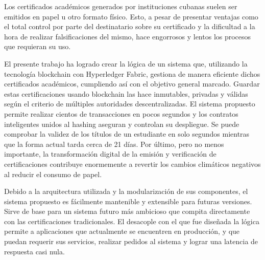 \begin{conclusions}
Los certificados académicos generados por instituciones cubanas suelen ser emitidos en papel u otro formato físico. Esto, a pesar de presentar ventajas como el total control por parte del destinatario sobre su certificado y la dificultad a la hora de realizar falsificaciones del mismo, hace engorrosos y lentos los procesos que requieran su uso.
    
El presente trabajo ha logrado crear la lógica de un sistema que, utilizando la tecnología blockchain con Hyperledger Fabric, gestiona de manera eficiente dichos certificados académicos, cumpliendo así con el objetivo general marcado. Guardar estas certificaciones usando blockchain las hace inmutables, privadas y válidas según el criterio de múltiples autoridades descentralizadas. El sistema propuesto permite realizar cientos de transacciones en pocos segundos y los contratos inteligentes unidos al hashing aseguran y controlan su despliegue. Se puede comprobar la validez de los títulos de un estudiante en solo segundos mientras que la forma actual tarda cerca de 21 días. Por último, pero no menos importante, la transformación digital de la emisión y verificación de certificaciones contribuye enormemente a revertir los cambios climáticos negativos al reducir el consumo de papel.

Debido a la arquitectura utilizada y la modularización de sus componentes, el sistema propuesto es fácilmente mantenible y extensible para futuras versiones. Sirve de base para un sistema futuro más ambicioso que compita directamente con las certificaciones tradicionales. El desacople con el que fue diseñada la lógica permite a aplicaciones que actualmente se encuentren en producción, y que puedan requerir sus servicios, realizar pedidos al sistema y lograr una latencia de respuesta casi nula.
\end{conclusions}
